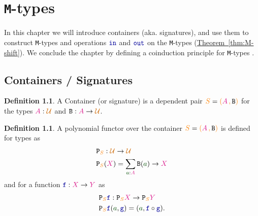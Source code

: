 \documentclass[twoside,11pt,openright]{report}
\theoremstyle{plain} %
\theoremstyle{definition}
\newtheorem{defn}[thm]{Definition}%
\theoremstyle{remark}
\newcommand*{\thmref}[1]{\hyperref[thm:#1]{Theorem~\ref*{thm:#1}}} %
\newcommand*{\term}[1]{\textcolor{green!30!black}{#1}} %
\newcommand*{\type}[1]{\textcolor{magenta!90!black}{#1}}
\newcommand*{\container}[1]{\textcolor{orange}{#1}}
\newcommand*{\containerpair}[2]{\ensuremath{\colorlet{savedleftcolor}{.}\color{orange}\left(\color{savedleftcolor}#1\,\textcolor{orange}{\mathbf{,}}\,#2\color{orange}\right)\color{savedleftcolor}}}
\newcommand*{\universe}[1]{\textcolor{orange!80!black}{#1}}
\newcommand*{\function}[1]{\textcolor{blue!60!black}{\ensuremath{\mathtt{#1}}}}
\newcommand*{\typeformer}[1]{\ensuremath{\mathtt{#1}}}
\newcommand*{\functor}[1]{\ensuremath{\mathbf{\mathtt{#1}}}}
\begin{document}

\chapter{\texttt{M}-types}
\label{ch:m-types}
In this chapter we will introduce containers (aka. signatures), and use them to construct \texttt{M}-types and operations \(\function{in}\) and \(\function{out}\) on the \texttt{M}-types (\thmref{M-shift}). We conclude the chapter by defining a coinduction principle for \texttt{M}-types \cite{DBLP:non-wellfounded}. 

\section{Containers / Signatures}
\begin{defn}
  A Container (or signature) is a dependent pair \(\container{S} = \containerpair{\type{A}}{\typeformer{B}}\) for the types \(\type{A} : \universe{\mathcal{U}}\) and \(\typeformer{B} : \type{A} \rightarrow \universe{\mathcal{U}}\).
\end{defn}
\begin{defn}
  A polynomial functor over the container \(\container{S} = \containerpair{\type{A}}{\typeformer{B}}\) is defined for types as
  \begin{equation}
    \begin{aligned}
      &\functor{P}_{\container{S}} : \universe{\mathcal{U}} \rightarrow \universe{\mathcal{U}} \\
      &\functor{P}_{\container{S}}(\type{X}) = \sum_{\term{a} : \type{A}} \typeformer{B}(\term{a}) \rightarrow \type{X}
    \end{aligned}
  \end{equation}
  and for a function \(\function{f} : \type{X} \rightarrow \type{Y}\) as
  \begin{equation}
    \begin{aligned}
      &\functor{P}_{\container{S}}\function{f} : \functor{P}_{\container{S}}\type{X} \rightarrow \functor{P}_{\container{S}}\type{Y} \\
      &\functor{P}_{\container{S}}\function{f}(\term{a},\function{g}) = (\term{a}, \function{f} \circ \function{g}).
    \end{aligned}
  \end{equation}
\end{defn}
\end{document}
